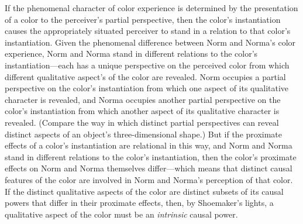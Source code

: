 \documentclass[12pt]{article}
\begin{document}
If the phenomenal character of color experience is determined by the presentation of a color to the perceiver's partial perspective, then the color's instantiation causes the appropriately situated perceiver to stand in a relation to that color's instantiation. Given the phenomenal difference between Norm and Norma's color experience, Norm and Norma stand in different relations to the color's instantiation---each has a unique perspective on the perceived color from which different qualitative aspect's of the color are revealed. Norm occupies a partial perspective on the color's instantiation from which one aspect of its qualitative character is revealed, and Norma occupies another partial perspective on the color's instantiation from which another aspect of its qualitative character is revealed. (Compare the way in which distinct partial perspectives can reveal distinct aspects of an object's three-dimensional shape.) But if the proximate effects of a color's instantiation are relational in this way, and Norm and Norma stand in different relations to the color's instantiation, then the color's proximate effects on Norm and Norma themselves differ---which means that distinct causal features of the color are involved in Norm and Norma's perception of that color. If the distinct qualitative aspects of the color are distinct subsets of its causal powers that differ in their proximate effects, then, by Shoemaker's lights, a qualitative aspect of the color must be an \emph{intrinsic} causal power.

\end{document}

